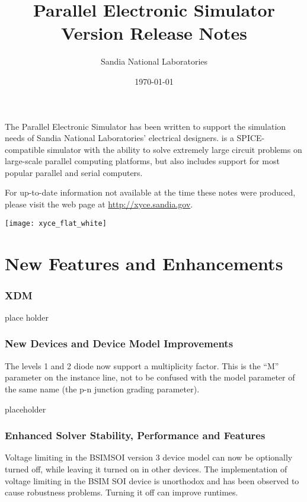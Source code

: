 \documentclass[letterpaper]{scrartcl}
\title{\XyceTitle{} Parallel Electronic Simulator\\
Version \XyceVersionVar{} Release Notes}
\author{ Sandia National Laboratories}
\date{\today}
\begin{document}
\maketitle

The \XyceTM{} Parallel Electronic Simulator has been written to support the
simulation needs of Sandia National Laboratories' electrical designers.
\XyceTM{} is a SPICE-compatible simulator with the ability to solve extremely
large circuit problems on large-scale parallel computing platforms, but also
includes support for most popular parallel and serial computers.

For up-to-date information not available at the time these notes were produced,
please visit the \XyceTM{} web page at
{\color{XyceDeepRed}\url{http://xyce.sandia.gov}}.

\tableofcontents
\vspace*{\fill}
\parbox{\textwidth}
{
  \hfill
  \texttt{[image: xyce\_flat\_white]}
}


\newpage
\section{New Features and Enhancements}

\subsubsection*{XDM}
\begin{XyceItemize}
  \item place holder
\end{XyceItemize}

\subsubsection*{New Devices and Device Model Improvements}
\begin{XyceItemize}
  \item The levels 1 and 2 diode now support a multiplicity factor.  This is the ``M'' parameter on the instance line, not to be confused with the model parameter of the same name (the p-n junction grading parameter).
  \item placeholder
\end{XyceItemize}

\subsubsection*{Enhanced Solver Stability, Performance and Features}
\begin{XyceItemize}
  \item Voltage limiting in the BSIMSOI version 3 device model can now be optionally turned off, while leaving it turned on in other devices.  The implementation of voltage limiting in the BSIM SOI device is unorthodox and has been observed to cause robustness problems.  Turning it off can improve runtimes.
\end{XyceItemize}
\end{document}
